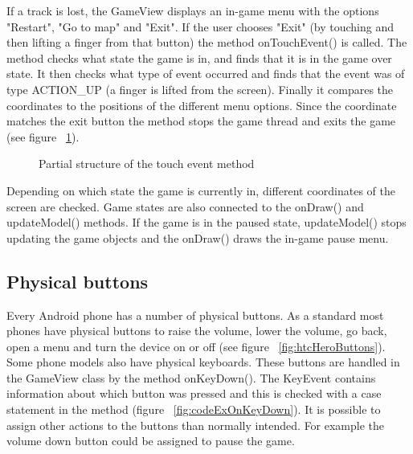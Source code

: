 If a track is lost, the GameView displays an in-game menu with the options "Restart", "Go to map" and "Exit". If the user chooses "Exit" (by touching and then lifting a finger from that button) the method onTouchEvent() is called. The method checks what state the game is in, and finds that it is in the game over state. It then checks what type of event occurred and finds that the event was of type ACTION\_UP (a finger is lifted from the screen). Finally it compares the coordinates to the positions of the different menu options. Since the coordinate matches the exit button the method stops the game thread and exits the game (see figure ~\ref{fig:codeExIngameExitButton}).

\begin{figure}[htb]
\begin{small}

\end{small}
\caption{Partial structure of the touch event method}
\label{fig:codeExIngameExitButton}
\end{figure}

Depending on which state the game is currently in, different coordinates of the screen are checked. Game states are also connected to the onDraw() and updateModel() methods. If the game is in the paused state, updateModel() stops updating the game objects and the onDraw() draws the in-game pause menu.

\subsection{Physical buttons}

Every Android phone has a number of physical buttons. As a standard most phones have physical buttons to raise the volume, lower the volume, go back, open a menu and turn the device on or off (see figure ~\ref{fig:htcHeroButtons}). Some phone models also have physical keyboards. These buttons are handled in the GameView class by the method onKeyDown(). The KeyEvent contains information about which button was pressed and this is checked with a case statement in the method (figure ~\ref{fig:codeExOnKeyDown}). It is possible to assign other actions to the buttons than normally intended. For example the volume down button could be assigned to pause the game.


